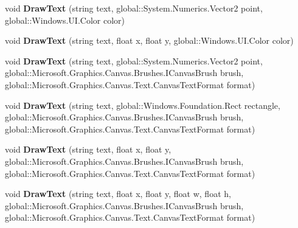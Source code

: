 \begin{DoxyCompactItemize}
void {\bfseries Draw\+Text} (string text, global\+::\+System.\+Numerics.\+Vector2 point, global\+::\+Windows.\+U\+I.\+Color color)
\item 
\mbox{\label{interface_microsoft_1_1_graphics_1_1_canvas_1_1_i_canvas_drawing_session_a83181f487c12a7e9b4e479850e54a316}} 
void {\bfseries Draw\+Text} (string text, float x, float y, global\+::\+Windows.\+U\+I.\+Color color)
\item 
\mbox{\label{interface_microsoft_1_1_graphics_1_1_canvas_1_1_i_canvas_drawing_session_a53c446ace8bf1d422773ac4d53b9c380}} 
void {\bfseries Draw\+Text} (string text, global\+::\+System.\+Numerics.\+Vector2 point, global\+::\+Microsoft.\+Graphics.\+Canvas.\+Brushes.\+I\+Canvas\+Brush brush, global\+::\+Microsoft.\+Graphics.\+Canvas.\+Text.\+Canvas\+Text\+Format format)
\item 
\mbox{\label{interface_microsoft_1_1_graphics_1_1_canvas_1_1_i_canvas_drawing_session_a3161a63423adf013a40c6d04be34dbd2}} 
void {\bfseries Draw\+Text} (string text, global\+::\+Windows.\+Foundation.\+Rect rectangle, global\+::\+Microsoft.\+Graphics.\+Canvas.\+Brushes.\+I\+Canvas\+Brush brush, global\+::\+Microsoft.\+Graphics.\+Canvas.\+Text.\+Canvas\+Text\+Format format)
\item 
\mbox{\label{interface_microsoft_1_1_graphics_1_1_canvas_1_1_i_canvas_drawing_session_af3067e2e1221c4fac0210f755a04504e}} 
void {\bfseries Draw\+Text} (string text, float x, float y, global\+::\+Microsoft.\+Graphics.\+Canvas.\+Brushes.\+I\+Canvas\+Brush brush, global\+::\+Microsoft.\+Graphics.\+Canvas.\+Text.\+Canvas\+Text\+Format format)
\item 
\mbox{\label{interface_microsoft_1_1_graphics_1_1_canvas_1_1_i_canvas_drawing_session_a176cf93d455896bcfa25da3ed7b41a7b}} 
void {\bfseries Draw\+Text} (string text, float x, float y, float w, float h, global\+::\+Microsoft.\+Graphics.\+Canvas.\+Brushes.\+I\+Canvas\+Brush brush, global\+::\+Microsoft.\+Graphics.\+Canvas.\+Text.\+Canvas\+Text\+Format format)

\end{DoxyCompactItemize}
